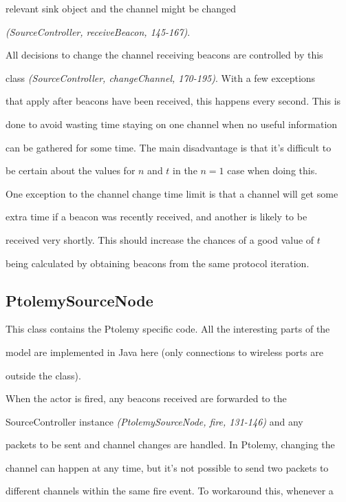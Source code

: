 \documentclass[a4paper,12pt,DIV=calc]{scrartcl}
\newcommand{\coderef}[3]{\emph{(#1, #2, #3)}}
\begin{document}
relevant sink object and the channel might be changed

\coderef{SourceController}{receiveBeacon}{145-167}.



All decisions to change the channel receiving beacons are controlled by this

class \coderef{SourceController}{changeChannel}{170-195}. With a few exceptions

that apply after beacons have been received, this happens every second. This is

done to avoid wasting time staying on one channel when no useful information

can be gathered for some time. The main disadvantage is that it's difficult to

be certain about the values for $n$ and $t$ in the $n = 1$ case when doing this.



One exception to the channel change time limit is that a channel will get some

extra time if a beacon was recently received, and another is likely to be

received very shortly. This should increase the chances of a good value of $t$

being calculated by obtaining beacons from the same protocol iteration.



\subsection{PtolemySourceNode}

This class contains the Ptolemy specific code. All the interesting parts of the

model are implemented in Java here (only connections to wireless ports are

outside the class).



When the actor is fired, any beacons received are forwarded to the

SourceController instance \coderef{PtolemySourceNode}{fire}{131-146} and any

packets to be sent and channel changes are handled. In Ptolemy, changing the

channel can happen at any time, but it's not possible to send two packets to

different channels within the same fire event. To workaround this, whenever a
\end{document}

